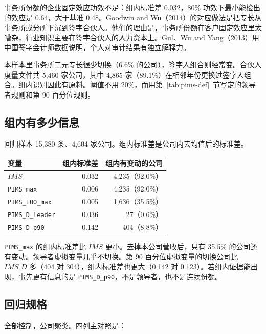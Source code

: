 \documentclass[11pt]{article}
\begin{document}
事务所份额的企业固定效应功效不足：组内标准差 0.032，80\% 功效下最小能检出的效应是 0.64，大于基准 0.48。Goodwin and Wu（2014）的对应做法是把专长从事务所或分所下沉到签字合伙人。他们的理由是，事务所份额在客户固定效应里太嘈杂，行业知识主要在签字合伙人的人力资本上。Gul、Wu and Yang（2013）用中国签字会计师数据说明，个人对审计结果有独立解释力。

本样本里事务所二元专长很少切换（6.6\% 的公司），签字人组合则经常变。合伙人度量文件共 5,460 家公司，其中 4,865 家（89.1\%）在相邻年份更换过签字人组合。组内识别因此有原料。阈值不用 20\%，而用第~\ref{tab:pims-def}~节写定的领导者规则和第 90 百分位规则。

\subsection{组内有多少信息}

回归样本 15,380 条、4,604 家公司。组内标准差是公司内去均值后的标准差。

\begin{center}
\begin{threeparttable}
\caption{合伙人指标的组内变动}
\label{tab:p-within}
\begin{tabular}{lrr}
\toprule
变量 & 组内标准差 & 组内有变动的公司 \\
\midrule
\(IMS\) & 0.032 & 4,235（92.0\%） \\
\texttt{PIMS\_max} & 0.006 & 4,235（92.0\%） \\
\texttt{PIMS\_LOO\_max} & 0.005 & 1,636（35.5\%） \\
\texttt{PIMS\_D\_leader} & 0.036 & 27（0.6\%） \\
\texttt{PIMS\_D\_p90} & 0.142 & 404（8.8\%） \\
\bottomrule
\end{tabular}
\end{threeparttable}
\end{center}

\texttt{PIMS\_max} 的组内标准差比 \(IMS\) 更小。去掉本公司营收后，只有 35.5\% 的公司还有变动。领导者虚拟变量几乎不切换。第 90 百分位虚拟变量的切换公司比 \(IMS\_D\) 多（404 对 304），组内标准差也更大（0.142 对 0.123）。若组内证据能出现，事先更有信息的是 \texttt{PIMS\_D\_p90}，不是领导者，也不是连续份额。

\subsection{回归规格}

全部控制，公司聚类。四列主对照是：
\end{document}
